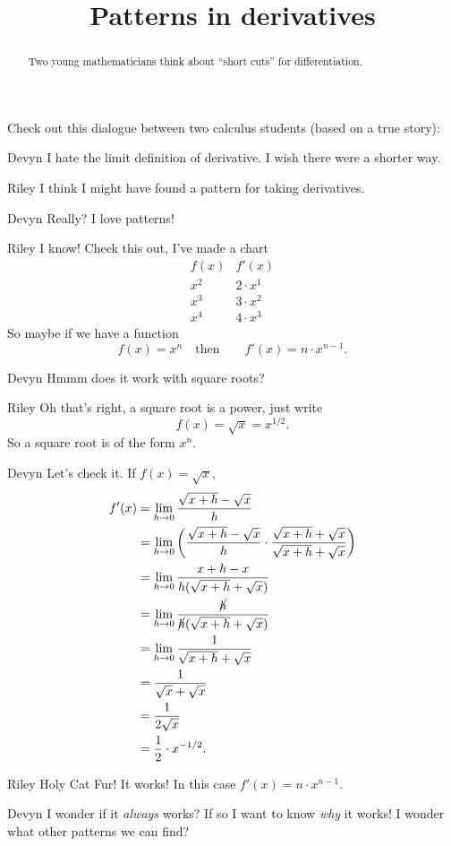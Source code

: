 \documentclass{ximera}
\title[Break-Ground:]{Patterns in derivatives}
\begin{document}
\begin{abstract}
Two young mathematicians think about ``short cuts'' for differentiation.
\end{abstract}
\maketitle

Check out this dialogue between two calculus students (based on a true
story):

\begin{dialogue}
\item[Devyn] I hate the limit definition of derivative.  I wish there
  were a shorter way.
\item[Riley] I think I might have found a pattern for taking
  derivatives.
\item[Devyn] Really? I love patterns!
\item[Riley] I know! Check this out, I've made a chart
{  \renewcommand*{\arraystretch}{1.3}
  \[
  \begin{array}{c|c}
    f(x) & f'(x)\\ \hline
    x^2 & 2\cdot x^1\\
    x^3 & 3\cdot x^2\\
    x^4 & 4\cdot x^3
  \end{array}
  \]
  }
  So maybe if we have a function
  \[
  f(x) = x^n\quad\text{then}\qquad f'(x) = n\cdot x^{n-1}.
  \]
\item[Devyn] Hmmm does it work with square roots?
\item[Riley] Oh that's right, a square root is a power, just write
  \[
  f(x) = \sqrt{x} = x^{1/2}.
  \]
  So a square root is of the form $x^n$.
\item[Devyn] Let's check it. If $f(x) = \sqrt{x}$,
  \begin{align*}
    f'(x) &= \lim_{h\to 0} \frac{\sqrt{x+h} -\sqrt{x}}{h}\\
    &= \lim_{h\to 0} \left(\frac{\sqrt{x+h} - \sqrt{x}}{h}\cdot \frac{\sqrt{x+h} + \sqrt{x}}{\sqrt{x+h} + \sqrt{x}}\right)\\
    &= \lim_{h\to 0} \frac{x+h - x}{h(\sqrt{x+h} + \sqrt{x})}\\
    &= \lim_{h\to 0} \frac{\cancel{h}}{\cancel{h}(\sqrt{x+h} + \sqrt{x})}\\
    &= \lim_{h\to 0} \frac{1}{\sqrt{x+h} + \sqrt{x}}\\
    &= \frac{1}{\sqrt{x} + \sqrt{x}}\\
    &= \frac{1}{2\sqrt{x}}\\
    &= \frac{1}{2}\cdot x^{-1/2}.
  \end{align*}
\item[Riley] Holy Cat Fur! It works! In this case $f'(x) = n\cdot
  x^{n-1}$.
  \item[Devyn] I wonder if it \textit{always} works? If so I want to
    know \textit{why} it works! I wonder what other patterns we can
    find?
\end{dialogue}
\end{document}
